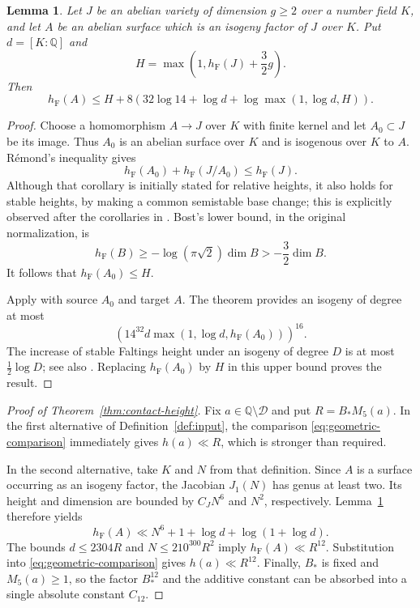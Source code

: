 \documentclass[11pt,a4paper]{article}
\newtheorem{lemma}[theorem]{Lemma}
\theoremstyle{definition}
\newcommand{\Q}{\mathbb Q}
\newcommand{\hF}{h_{\mathrm F}}
\begin{document}
\begin{lemma}\label{lem:surface}
Let $J$ be an abelian variety of dimension $g\ge2$ over a number
field $K$, and let $A$ be an abelian surface which is an isogeny
factor of $J$ over $K$. Put $d=[K:\Q]$ and
\[
 H=\max\left(1,\hF(J)+\frac32g\right).
\]
Then
\[
 \hF(A)\le H+
 8\left(32\log14+\log d+
 \log\max(1,\log d,H)\right).
\]
\end{lemma}
\begin{proof}
Choose a homomorphism $A\to J$ over $K$ with finite kernel and
let $A_0\subset J$ be its image. Thus $A_0$ is an abelian surface
over $K$ and is isogenous over $K$ to $A$.
R\'emond's inequality \cite[Corollary~1.2]{Remond} gives
\[
 \hF(A_0)+\hF(J/A_0)\le\hF(J).
\]
Although that corollary is initially stated for relative heights,
it also holds for stable heights, by making a common semistable
base change; this is explicitly observed after the corollaries
in \cite{Remond}. Bost's lower bound, in the original
normalization, is
\[
 \hF(B)\ge-\log(\pi\sqrt2)\dim B>-\frac32\dim B.
\]
It follows that $\hF(A_0)\le H$.

Apply \cite[Theorem~1.9(1)]{GaudronRemond} with source $A_0$
and target $A$. The theorem provides an isogeny of degree at
most
\[
 \left(14^{32}d\max(1,\log d,\hF(A_0))\right)^{16}.
\]
The increase of stable Faltings height under an isogeny of
degree $D$ is at most $\tfrac12\log D$; see also
\cite[Proposition~2.1]{Remond}. Replacing $\hF(A_0)$ by $H$
in this upper bound proves the result.
\end{proof}

\begin{proof}[Proof of Theorem~\ref{thm:contact-height}]
Fix $a\in\Q\setminus\mathcal D$ and put $R=B_*M_5(a)$.
In the first alternative of Definition~\ref{def:input}, the
comparison \eqref{eq:geometric-comparison} immediately gives
$h(a)\ll R$, which is stronger than required.

In the second alternative, take $K$ and $N$ from that definition.
Since $A$ is a surface occurring as an isogeny factor, the
Jacobian $J_1(N)$ has genus at least two. Its height and
dimension are bounded by $C_JN^6$ and $N^2$, respectively.
Lemma~\ref{lem:surface} therefore yields
\[
 \hF(A)\ll N^6+1+\log d+\log(1+\log d).
\]
The bounds $d\le2304R$ and $N\le210^{300}R^2$ imply
$\hF(A)\ll R^{12}$. Substitution into
\eqref{eq:geometric-comparison} gives $h(a)\ll R^{12}$.
Finally, $B_*$ is fixed and $M_5(a)\ge1$, so the factor
$B_*^{12}$ and the additive constant can be absorbed into a
single absolute constant $C_{12}$.
\end{proof}
\end{document}
